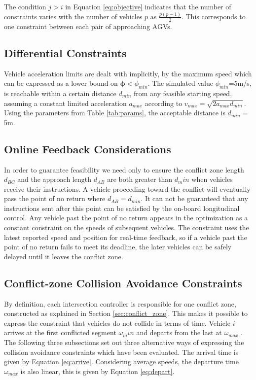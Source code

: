 The condition $j > i$ in Equation \ref{eq:objective} indicates that the number of constraints varies with the number of vehicles $p$ as $\frac{p(p-1)}{2}$. This corresponds to one constraint between each pair of approaching AGVs.

\subsection{Differential Constraints}
Vehicle acceleration limits are dealt with implicitly, by the maximum speed which can be expressed as a lower bound on $\bm{\phi} < \phi_{min}$. The simulated value $\phi_{min}$=5m/s, is reachable within a certain distance $d_{min}$ from any feasible starting speed, assuming a constant limited acceleration $a_{max}$ according to $v_{max} = \sqrt{2 a_{max} d_{min}} $. Using the parameters from Table \ref{tab:params}, the acceptable distance is $d_{min}=$5m.

\subsection{Online Feedback Considerations}
In order to guarantee feasibility we need only to ensure the conflict zone length $d_{BC}$ and the approach length $d_{AB}$ are both greater than $d_min$ when vehicles receive their instructions. A vehicle proceeding toward the conflict will eventually pass the point of no return where $d_{AB} = d_{min}$. It can not be guaranteed that any instructions sent after this point can be satisfied by the on-board longitudinal control. Any vehicle past the point of no return appears in the optimization as a constant constraint on the speeds of subsequent vehicles. The constraint uses the latest reported speed and position for real-time feedback, so if a vehicle past the point of no return fails to meet its deadline, the later vehicles can be safely delayed until it leaves the conflict zone.  

\subsection{Conflict-zone Collision Avoidance Constraints} 
By definition, each intersection controller is responsible for one conflict zone, constructed as explained in Section \ref{sec:conflict_zone}. This makes it
possible to express the constraint that vehicles do not collide
in terms of time. Vehicle $i$ arrives at the first conflicted
segment $\omega_min$ and departs from the last at $\omega_{max}$ . The following three subsections set out three alternative ways
of expressing the collision avoidance constraints which have
been evaluated. The arrival time is given by Equation \ref{eq:arrive}. Considering average speeds, the departure time $\omega_{max}$ is also linear, this is given by Equation \ref{eq:depart}.

